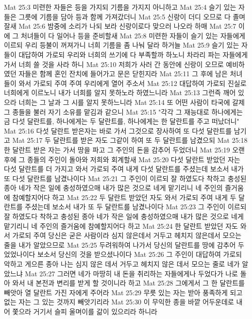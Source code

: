 Mat 25:3  미련한 자들은 등을 가지되 기름을 가지지 아니하고
Mat 25:4  슬기 있는 자들은 그릇에 기름을 담아 등과 함께 가져갔더니
Mat 25:5  신랑이 더디 오므로 다 졸며 잘새
Mat 25:6  밤중에 소리가 나되 보라 신랑이로다 맞으러 나오라 하매
Mat 25:7  이에 그 처녀들이 다 일어나 등을 준비할새
Mat 25:8  미련한 자들이 슬기 있는 자들에게 이르되 우리 등불이 꺼져가니 너희 기름을 좀 나눠 달라 하거늘
Mat 25:9  슬기 있는 자들이 대답하여 가로되 우리와 너희의 쓰기에 다 부족할까 하노니 차라리 파는 자들에게 가서 너희 쓸 것을 사라 하니
Mat 25:10  저희가 사러 간 동안에 신랑이 오므로 예비하였던 자들은 함께 혼인 잔치에 들어가고 문은 닫힌지라
Mat 25:11  그 후에 남은 처녀들이 와서 가로되 주여 주여 우리에게 열어 주소서
Mat 25:12  대답하여 가로되 진실로 너희에게 이르노니 내가 너희를 알지 못하노라 하였느니라
Mat 25:13  그런즉 깨어 있으라 너희는 그 날과 그 시를 알지 못하느니라
Mat 25:14  또 어떤 사람이 타국에 갈제 그 종들을 불러 자기 소유를 맡김과 같으니
Mat 25:15  "각각 그 재능대로 하나에게는 금 다섯 달란트를, 하나에게는 두 달란트를, 하나에게는 한 달란트를 주고 떠났더니"
Mat 25:16  다섯 달란트 받은자는 바로 가서 그것으로 장사하여 또 다섯 달란트를 남기고
Mat 25:17  두 달란트를 받은 자도 그같이 하여 또 두 달란트를 남겼으되
Mat 25:18  한 달란트 받은 자는 가서 땅을 파고 그 주인의 돈을 감추어 두었더니
Mat 25:19  오랜 후에 그 종들의 주인이 돌아와 저희와 회계할새
Mat 25:20  다섯 달란트 받았던 자는 다섯 달란트를 더 가지고 와서 가로되 주여 내게 다섯 달란트를 주셨는데 보소서 내가 또 다섯 달란트를 남겼나이다
Mat 25:21  그 주인이 이르되 잘 하였도다 착하고 충성된 종아 네가 작은 일에 충성하였으매 내가 많은 것으로 네게 맡기리니 네 주인의 즐거움에 참예할지어다 하고
Mat 25:22  두 달란트 받았던 자도 와서 가로되 주여 내게 두 달란트를 주셨는데 보소서 내가 또 두 달란트를 남겼나이다
Mat 25:23  그 주인이 이르되 잘 하였도다 착하고 충성된 종아 네가 작은 일에 충성하였으매 내가 많은 것으로 네게 맡기리니 네 주인의 즐거움에 참예할지어다 하고
Mat 25:24  한 달란트 받았던 자도 와서 가로되 주여 당신은 굳은 사람이라 심지 않은데서 거두고 헤치지 않은데서 모으는 줄을 내가 알았으므로
Mat 25:25  두려워하여 나가서 당신의 달란트를 땅에 감추어 두었었나이다 보소서 당신의 것을 받으셨나이다
Mat 25:26  그 주인이 대답하여 가로되 악하고 게으른 종아 나는 심지 않은 데서 거두고 헤치지 않은 데서 모으는 줄로 네가 알았느냐
Mat 25:27  그러면 네가 마땅히 내 돈을 취리하는 자들에게나 두었다가 나로 돌아 와서 내 본전과 변리를 받게 할 것이니라 하고
Mat 25:28  그에게서 그 한 달란트를 빼앗아 열 달란트 가진 자에게 주어라
Mat 25:29  무릇 있는 자는 받아 풍족하게 되고 없는 자는 그 있는 것까지 빼앗기리라
Mat 25:30  이 무익한 종을 바깥 어두운데로 내어 쫓으라 거기서 슬피 울며이를 갊이 있으리라 하니라
